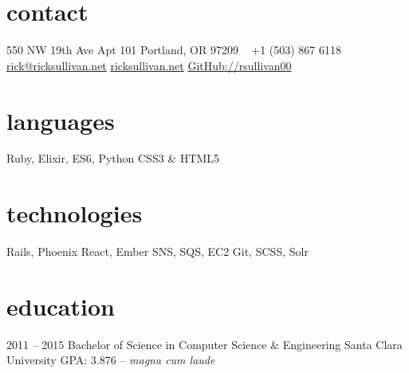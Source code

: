 \documentclass[]{friggeri-cv} %
\begin{document}


\begin{aside} %
\section{contact}
550 NW 19th Ave
Apt 101
Portland, OR 97209
~
+1 (503) 867 6118
~
\href{mailto:rick@ricksullivan.net}{rick@ricksullivan.net}
\href{https://ricksullivan.net}{ricksullivan.net}
\href{https://github.com/rsullivan00}{GitHub://rsullivan00}
%
\section{languages}
Ruby, Elixir, ES6, Python
CSS3 \& HTML5
%
\section{technologies}
Rails, Phoenix
React, Ember
SNS, SQS, EC2
Git, SCSS, Solr
\end{aside}

\section{education}

\begin{entrylist}

\entry
{2011 -- 2015}
{Bachelor of Science {\normalfont in Computer Science \& Engineering}}
{Santa Clara University}
{GPA: 3.876 -- \emph{magna cum laude}}



\end{entrylist}

\end{document}
